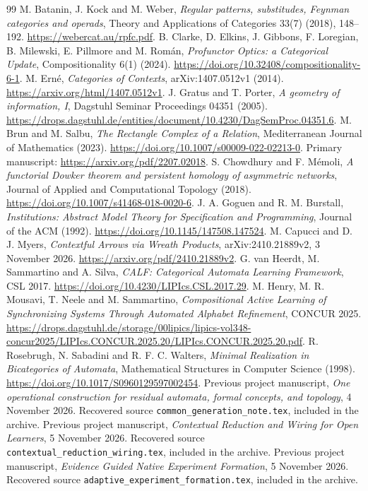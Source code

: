 \documentclass[11pt]{article}
\theoremstyle{definition}\newtheorem{definition}[theorem]{Definition}
\theoremstyle{remark}\newtheorem{remark}[theorem]{Remark}
\begin{document}
\begin{thebibliography}{99}
 M. Batanin, J. Kock and M. Weber,
\emph{Regular patterns, substitudes, Feynman categories and operads},
Theory and Applications of Categories 33(7) (2018), 148--192.
\url{https://webercat.au/rpfc.pdf}.
 B. Clarke, D. Elkins, J. Gibbons, F. Loregian,
B. Milewski, E. Pillmore and M. Rom\'an,
\emph{Profunctor Optics: a Categorical Update}, Compositionality 6(1) (2024).
\url{https://doi.org/10.32408/compositionality-6-1}.
 M. Ern\'e, \emph{Categories of Contexts},
arXiv:1407.0512v1 (2014).
\url{https://arxiv.org/html/1407.0512v1}.
 J. Gratus and T. Porter, \emph{A geometry of information, I},
Dagstuhl Seminar Proceedings 04351 (2005).
\url{https://drops.dagstuhl.de/entities/document/10.4230/DagSemProc.04351.6}.
 M. Brun and M. Salbu, \emph{The Rectangle Complex of a Relation},
Mediterranean Journal of Mathematics (2023).
\url{https://doi.org/10.1007/s00009-022-02213-0}.
Primary manuscript: \url{https://arxiv.org/pdf/2207.02018}.
 S. Chowdhury and F. M\'emoli,
\emph{A functorial Dowker theorem and persistent homology of asymmetric networks},
Journal of Applied and Computational Topology (2018).
\url{https://doi.org/10.1007/s41468-018-0020-6}.
 J. A. Goguen and R. M. Burstall,
\emph{Institutions: Abstract Model Theory for Specification and Programming},
Journal of the ACM (1992).
\url{https://doi.org/10.1145/147508.147524}.
 M. Capucci and D. J. Myers,
\emph{Contextful Arrows via Wreath Products}, arXiv:2410.21889v2,
3 November 2026.
\url{https://arxiv.org/pdf/2410.21889v2}.
 G. van Heerdt, M. Sammartino and A. Silva,
\emph{CALF: Categorical Automata Learning Framework}, CSL 2017.
\url{https://doi.org/10.4230/LIPIcs.CSL.2017.29}.
 M. Henry, M. R. Mousavi, T. Neele and M. Sammartino,
\emph{Compositional Active Learning of Synchronizing Systems Through
Automated Alphabet Refinement}, CONCUR 2025.
\url{https://drops.dagstuhl.de/storage/00lipics/lipics-vol348-concur2025/LIPIcs.CONCUR.2025.20/LIPIcs.CONCUR.2025.20.pdf}.
 R. Rosebrugh, N. Sabadini and R. F. C. Walters,
\emph{Minimal Realization in Bicategories of Automata},
Mathematical Structures in Computer Science (1998).
\url{https://doi.org/10.1017/S0960129597002454}.
 Previous project manuscript,
\emph{One operational construction for residual automata, formal concepts,
and topology}, 4 November 2026.
Recovered source \texttt{common\_generation\_note.tex}, included in the archive.
 Previous project manuscript,
\emph{Contextual Reduction and Wiring for Open Learners}, 5 November 2026.
Recovered source \texttt{contextual\_reduction\_wiring.tex}, included in the archive.
 Previous project manuscript,
\emph{Evidence Guided Native Experiment Formation}, 5 November 2026.
Recovered source \texttt{adaptive\_experiment\_formation.tex}, included in the archive.
\end{thebibliography}
\end{document}
